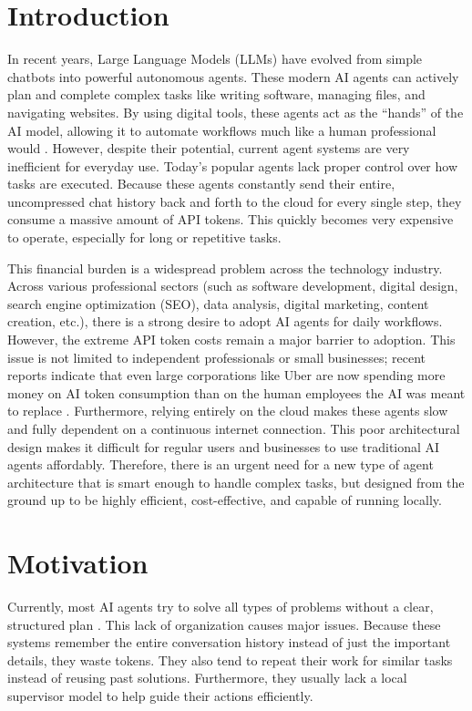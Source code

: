 \section{Introduction}
In recent years, Large Language Models (LLMs) have evolved from simple chatbots into powerful autonomous agents. These modern AI agents can actively plan and complete complex tasks like writing software, managing files, and navigating websites. By using digital tools, these agents act as the ``hands'' of the AI model, allowing it to automate workflows much like a human professional would \cite{agent_survey}. However, despite their potential, current agent systems are very inefficient for everyday use. Today's popular agents lack proper control over how tasks are executed. Because these agents constantly send their entire, uncompressed chat history back and forth to the cloud for every single step, they consume a massive amount of API tokens. This quickly becomes very expensive to operate, especially for long or repetitive tasks.

This financial burden is a widespread problem across the technology industry. Across various professional sectors (such as software development, digital design, search engine optimization (SEO), data analysis, digital marketing, content creation, etc.), there is a strong desire to adopt AI agents for daily workflows. However, the extreme API token costs remain a major barrier to adoption. This issue is not limited to independent professionals or small businesses; recent reports indicate that even large corporations like Uber are now spending more money on AI token consumption than on the human employees the AI was meant to replace \cite{uber_ai_cost}. Furthermore, relying entirely on the cloud makes these agents slow and fully dependent on a continuous internet connection. This poor architectural design makes it difficult for regular users and businesses to use traditional AI agents affordably. Therefore, there is an urgent need for a new type of agent architecture that is smart enough to handle complex tasks, but designed from the ground up to be highly efficient, cost-effective, and capable of running locally.\\


\section{Motivation}
Currently, most AI agents try to solve all types of problems without a clear, structured plan \cite{general_ai_agent1, general_ai_agent2}. This lack of organization causes major issues. Because these systems remember the entire conversation history instead of just the important details, they waste tokens. They also tend to repeat their work for similar tasks instead of reusing past solutions. Furthermore, they usually lack a local supervisor model to help guide their actions efficiently.\\

